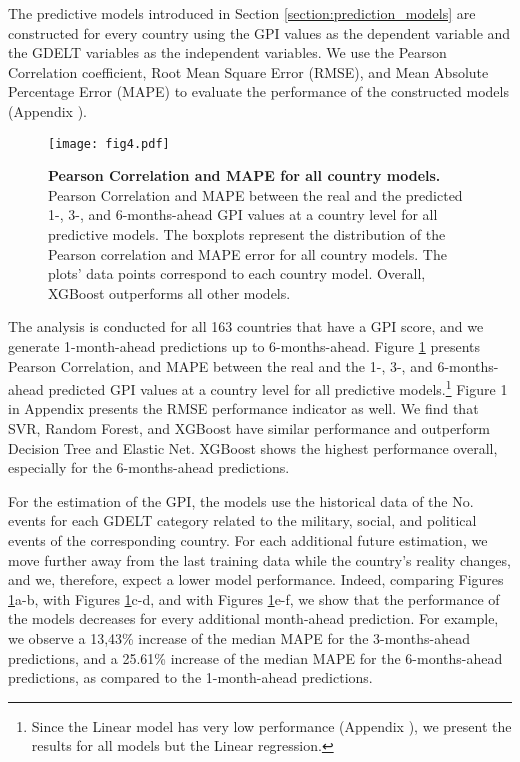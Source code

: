 \documentclass{bmcart}
\begin{document}
The predictive models introduced in Section \ref{section:prediction_models} are constructed for every country using the GPI values as the dependent variable and the GDELT variables as the independent variables. 
We use the Pearson Correlation coefficient, Root Mean Square Error (RMSE), and Mean Absolute Percentage Error (MAPE) \cite{james2013introduction,kassambara2018machine,de2016mean} to evaluate the performance of the constructed models (Appendix ).

\begin{figure}[htp]
\centering
\texttt{[image: fig4.pdf]}
\caption{\textbf{Pearson Correlation and MAPE for all country models.} Pearson Correlation and MAPE between the real and the predicted 1-, 3-, and 6-months-ahead GPI values at a country level for all predictive models. The boxplots represent the distribution of the Pearson correlation and MAPE error for all country models. The plots' data points correspond to each country model. Overall, XGBoost outperforms all other models.}
\label{fig:perf_ind}
\end{figure}

The analysis is conducted for all 163 countries that have a GPI score, and we generate 1-month-ahead predictions up to 6-months-ahead. 
Figure \ref{fig:perf_ind} presents Pearson Correlation, and MAPE between the real and the 1-, 3-, and 6-months-ahead predicted GPI values at a country level for all predictive models.\footnote{Since the Linear model has very low performance (Appendix ), we present the results for all models but the Linear regression.}
Figure 1 in Appendix  presents the RMSE performance indicator as well. 
We find that SVR, Random Forest, and XGBoost have similar performance and outperform Decision Tree and Elastic Net. 
XGBoost shows the highest performance overall, especially for the 6-months-ahead predictions.

For the estimation of the GPI, the models use the historical data of the No. events for each GDELT category related to the military, social, and political events of the corresponding country. For each additional future estimation, we move further away from the last training data while the country's reality changes, and we, therefore, expect a lower model performance. 
Indeed, comparing Figures \ref{fig:perf_ind}a-b, with Figures \ref{fig:perf_ind}c-d, and with Figures \ref{fig:perf_ind}e-f, we show that the performance of the models decreases for every additional month-ahead prediction. 
For example, we observe a 13,43\% increase of the median MAPE for the 3-months-ahead predictions, and a 25.61\% increase of the median MAPE for the 6-months-ahead predictions, as compared to the 1-month-ahead predictions.
\end{document}
